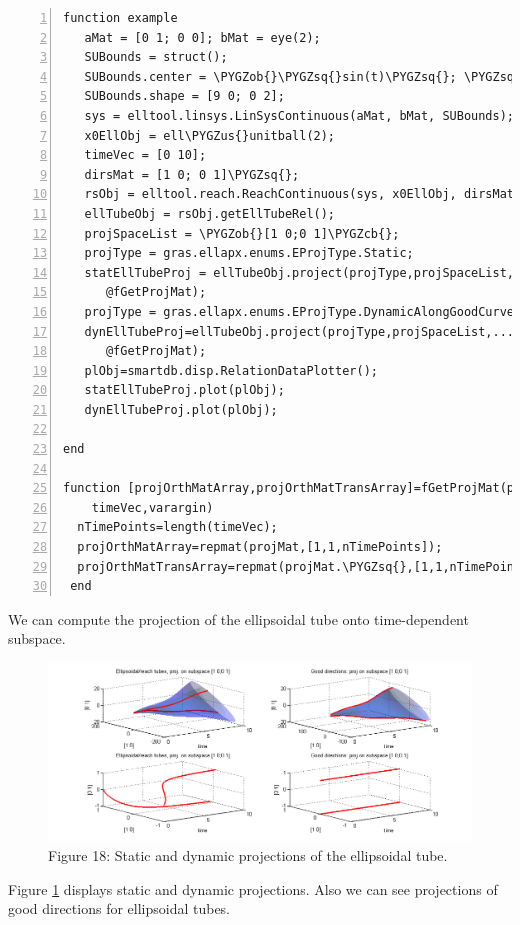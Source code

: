 \documentclass[letterpaper,10pt,english]{sphinxmanual}
\def\PYGZus{\char`\_}
\def\PYGZob{\char`\{}
\def\PYGZcb{\char`\}}
\def\PYGZsq{\char`\'}
\begin{document}
\begin{Verbatim}[commandchars=\\\{\},numbers=left,firstnumber=1,stepnumber=1]
function example
   aMat = [0 1; 0 0]; bMat = eye(2);  
   SUBounds = struct();
   SUBounds.center = \PYGZob{}\PYGZsq{}sin(t)\PYGZsq{}; \PYGZsq{}cos(t)\PYGZsq{}\PYGZcb{};  
   SUBounds.shape = [9 0; 0 2]; 
   sys = elltool.linsys.LinSysContinuous(aMat, bMat, SUBounds);
   x0EllObj = ell\PYGZus{}unitball(2);
   timeVec = [0 10]; 
   dirsMat = [1 0; 0 1]\PYGZsq{};  
   rsObj = elltool.reach.ReachContinuous(sys, x0EllObj, dirsMat, timeVec);
   ellTubeObj = rsObj.getEllTubeRel();
   projSpaceList = \PYGZob{}[1 0;0 1]\PYGZcb{};
   projType = gras.ellapx.enums.EProjType.Static;
   statEllTubeProj = ellTubeObj.project(projType,projSpaceList,...
      @fGetProjMat);
   projType = gras.ellapx.enums.EProjType.DynamicAlongGoodCurve;
   dynEllTubeProj=ellTubeObj.project(projType,projSpaceList,...
      @fGetProjMat);
   plObj=smartdb.disp.RelationDataPlotter();
   statEllTubeProj.plot(plObj);
   dynEllTubeProj.plot(plObj);

end

function [projOrthMatArray,projOrthMatTransArray]=fGetProjMat(projMat,...
    timeVec,varargin)
  nTimePoints=length(timeVec);
  projOrthMatArray=repmat(projMat,[1,1,nTimePoints]);
  projOrthMatTransArray=repmat(projMat.\PYGZsq{},[1,1,nTimePoints]);
 end
\end{Verbatim}

We can compute the projection of the ellipsoidal
tube onto time-dependent subspace.
\begin{figure}[htbp]
\centering
\capstart

\includegraphics[width=1.000\linewidth]{chapter05_section03_reachTubeStatProjreachTubeDynProj.png}
\caption{Figure 18: Static and dynamic projections of the ellipsoidal tube.}\label{chap_implement:statdyn-proj}\end{figure}

Figure \hyperref[chap_implement:statdyn-proj]{ \ref*{chap_implement:statdyn-proj}} displays static and dynamic projections.
Also we can see projections of good directions for ellipsoidal tubes.
\end{document}
